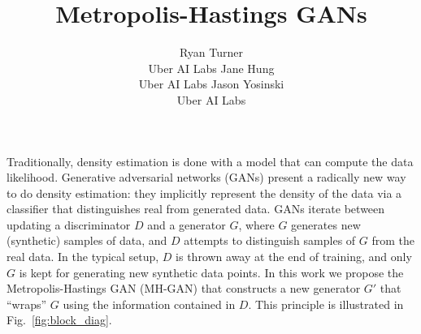 \documentclass{article}
\title{Metropolis-Hastings GANs}
\author{
  Ryan Turner \\
  Uber AI Labs
  \And
  Jane Hung \\
  Uber AI Labs
  \And
  Jason Yosinski \\
  Uber AI Labs
}
\begin{document}

\maketitle



Traditionally, density estimation is done with a model that can compute the data likelihood.
Generative adversarial networks (GANs) \citep{Goodfellow2014} present a radically new way to do density estimation:
they implicitly represent the density of the data via a classifier that distinguishes real from generated data.
GANs iterate between updating a discriminator $D$ and a generator $G$, where $G$ generates new (synthetic) samples of data, and $D$ attempts to distinguish samples of $G$ from the real data.
In the typical setup, $D$ is thrown away at the end of training, and only $G$ is kept for generating new synthetic data points.
In this work we propose the Metropolis-Hastings GAN (MH-GAN) that constructs a new generator $G'$ that ``wraps'' $G$ using the information contained in $D$.
This principle is illustrated in Fig.~\ref{fig:block_diag}.
\end{document}
